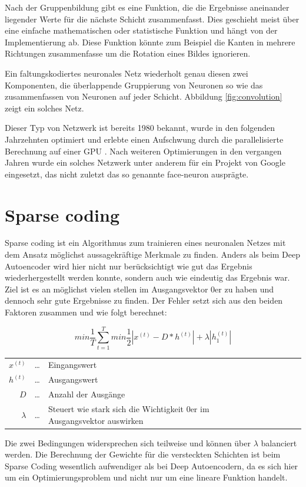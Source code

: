 Nach der Gruppenbildung gibt es eine Funktion, die die Ergebnisse aneinander liegender Werte für die nächste Schicht zusammenfasst. Dies geschieht meist über eine einfache mathematischen oder statistische Funktion und hängt von der Implementierung ab. Diese Funktion könnte zum Beispiel die Kanten in mehrere Richtungen zusammenfasse um die Rotation eines Bildes ignorieren.

Ein faltungskodiertes neuronales Netz wiederholt genau diesen zwei Komponenten, die überlappende Gruppierung von Neuronen so wie das zusammenfassen von Neuronen auf jeder Schicht. Abbildung \ref{fig:convolution} zeigt ein solches Netz.

Dieser Typ von Netzwerk ist bereits 1980 \citep{convolutional} bekannt, wurde in den folgenden Jahrzehnten optimiert und erlebte einen Aufschwung durch die parallelisierte Berechnung auf einer GPU \citep{dandan}. Nach weiteren Optimierungen in den vergangen Jahren wurde ein solches Netzwerk unter anderem für ein Projekt von Google \citep{googleimage} eingesetzt, das nicht zuletzt das so genannte face-neuron ausprägte.

\section{Sparse coding}

Sparse coding ist ein Algorithmus zum trainieren eines neuronalen Netzes mit dem Ansatz möglichst aussagekräftige Merkmale zu finden. Anders als beim Deep Autoencoder wird hier nicht nur berücksichtigt wie gut das Ergebnis wiederhergestellt werden konnte, sondern auch wie eindeutig das Ergebnis war. Ziel ist es an möglichst vielen stellen im Ausgangsvektor 0er zu haben und dennoch sehr gute Ergebnisse zu finden. Der Fehler setzt sich aus den beiden Faktoren zusammen und wie folgt berechnet:

$$min\frac{1}{T}\sum_{t=1}^{T}min\frac{1}{2}|x^{(t)}-D*h^{(t)}|+\lambda|h^{(t)}_1|$$
\begin{center}\begin{tabular}{rclcrcl}
	$x^{(t)}$ & \dots & Eingangswert\\
	$h^{(t)}$ & \dots & Ausgangswert\\
	$D$ & \dots & Anzahl der Ausgänge\\
	$\lambda$ & \dots & Steuert wie stark sich die Wichtigkeit 0er im Ausgangsvektor auswirken\\ 
\end{tabular}\end{center}

Die zwei Bedingungen widersprechen sich teilweise und können über $\lambda$ balanciert werden. Die Berechnung der Gewichte für die versteckten Schichten ist beim Sparse Coding wesentlich aufwendiger als bei Deep Autoencodern, da es sich hier um ein Optimierungsproblem und nicht nur um eine lineare Funktion handelt.
